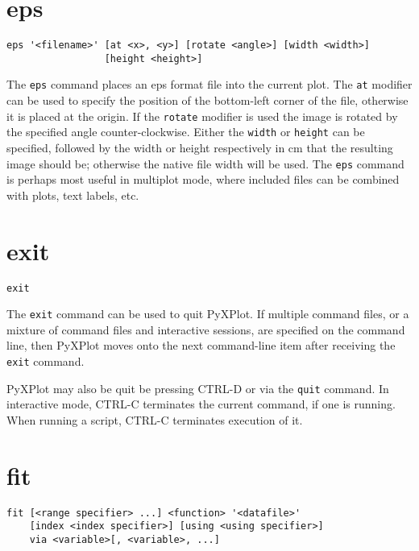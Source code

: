 \section{eps}

\begin{verbatim}
eps '<filename>' [at <x>, <y>] [rotate <angle>] [width <width>]
                 [height <height>]
\end{verbatim}

The {\tt eps} command places an eps format file into the current plot.  The
{\tt at} modifier can be used to specify the position of the bottom-left corner
of the file, otherwise it is placed at the origin.  If the {\tt rotate} modifier
is used the image is rotated by the specified angle counter-clockwise.  Either
the {\tt width} or {\tt height} can be specified, followed by the width or
height respectively in cm that the resulting image should be; otherwise the
native file width will be used.  The {\tt eps} command is perhaps most useful in
multiplot mode, where included files can be combined with plots, text labels,
etc.

\section{exit}

\begin{verbatim}
exit
\end{verbatim}

The {\tt exit} command can be used to quit PyXPlot. If multiple command files,
or a mixture of command files and interactive sessions, are specified on the
command line, then PyXPlot moves onto the next command-line item after receiving
the {\tt exit} command.

PyXPlot may also be quit be pressing CTRL-D or via the {\tt quit} command. In
interactive mode, CTRL-C terminates the current command, if one is running.
When running a script, CTRL-C terminates execution of it.


\section{fit}

\begin{verbatim}
fit [<range specifier> ...] <function> '<datafile>'
    [index <index specifier>] [using <using specifier>]
    via <variable>[, <variable>, ...]
\end{verbatim}

